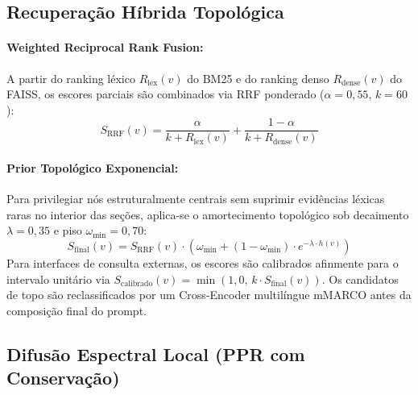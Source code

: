 \documentclass[10pt,twocolumn]{article}
\theoremstyle{definition}
\begin{document}
\subsection{Recuperação Híbrida Topológica}

\paragraph{Weighted Reciprocal Rank Fusion:}
A partir do ranking léxico $R_{\text{lex}}(v)$ do BM25 e do ranking denso $R_{\text{dense}}(v)$ do FAISS, os escores parciais são combinados via RRF ponderado ($\alpha = 0,55$, $k = 60$):
\begin{equation}
S_{\text{RRF}}(v) = \frac{\alpha}{k + R_{\text{lex}}(v)} + \frac{1 - \alpha}{k + R_{\text{dense}}(v)}
\end{equation}

\paragraph{Prior Topológico Exponencial:}
Para privilegiar nós estruturalmente centrais sem suprimir evidências léxicas raras no interior das seções, aplica-se o amortecimento topológico sob decaimento $\lambda = 0,35$ e piso $\omega_{\min} = 0,70$:
\begin{equation}
S_{\text{final}}(v) = S_{\text{RRF}}(v) \cdot \left( \omega_{\min} + (1 - \omega_{\min}) \cdot e^{-\lambda \cdot h(v)} \right)
\end{equation}
Para interfaces de consulta externas, os escores são calibrados afinmente para o intervalo unitário via $S_{\text{calibrado}}(v) = \min(1,0, \, k \cdot S_{\text{final}}(v))$. Os candidatos de topo são reclassificados por um Cross-Encoder multilíngue mMARCO antes da composição final do prompt.

\subsection{Difusão Espectral Local (PPR com Conservação)}
\end{document}
